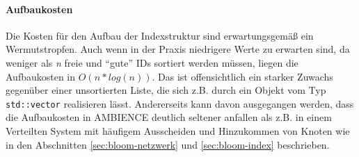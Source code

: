 \paragraph*{Aufbaukosten}
Die Kosten für den Aufbau der Indexstruktur sind erwartungsgemäß ein Wermutstropfen. Auch wenn in der Praxis niedrigere Werte zu erwarten sind, da weniger als \textit{n} freie und "`gute"' IDs sortiert werden müssen, liegen die Aufbaukosten in $O(n\ast log(n))$. Das ist offensichtlich ein starker Zuwachs gegenüber einer unsortierten Liste, die sich z.B. durch ein Objekt vom Typ \texttt{std::vector} realisieren lässt. Andererseits kann davon ausgegangen werden, dass die Aufbaukosten in AMBIENCE deutlich seltener anfallen als z.B. in einem Verteilten System mit häufigem Ausscheiden und Hinzukommen von Knoten wie in den Abschnitten \ref{sec:bloom-netzwerk} und \ref{sec:bloom-index} beschrieben.